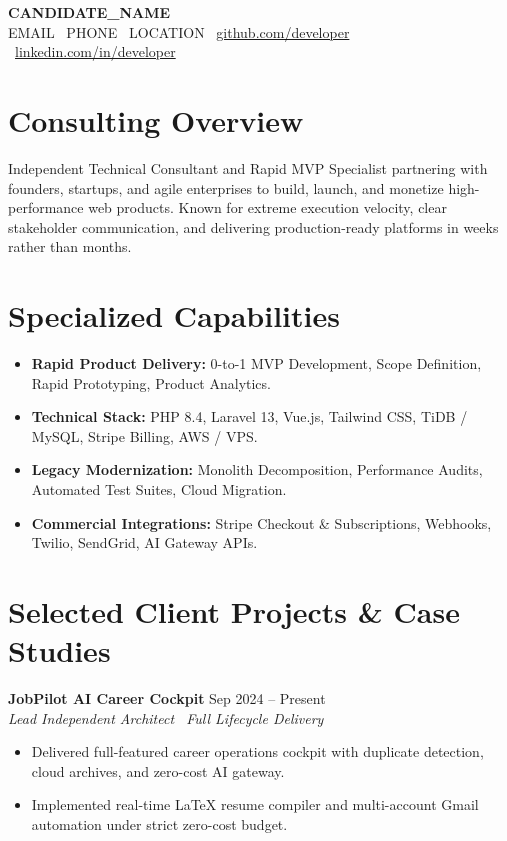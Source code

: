 \documentclass[10pt,a4paper]{article}
\begin{document}
\begin{center}
    {\huge \textbf{{{CANDIDATE_NAME}}}}\\[3pt]
    \small {{EMAIL}} \textbar\ {{PHONE}} \textbar\ {{LOCATION}} \textbar\ \href{https://github.com/candidate}{github.com/developer} \textbar\ \href{https://linkedin.com/in/candidate}{linkedin.com/in/developer}
\end{center}

\vspace{-4pt}
\section{Consulting Overview}
Independent Technical Consultant and Rapid MVP Specialist partnering with founders, startups, and agile enterprises to build, launch, and monetize high-performance web products. Known for extreme execution velocity, clear stakeholder communication, and delivering production-ready platforms in weeks rather than months.

\section{Specialized Capabilities}
\begin{itemize}
    \item \textbf{Rapid Product Delivery:} 0-to-1 MVP Development, Scope Definition, Rapid Prototyping, Product Analytics.
    \item \textbf{Technical Stack:} PHP 8.4, Laravel 13, Vue.js, Tailwind CSS, TiDB / MySQL, Stripe Billing, AWS / VPS.
    \item \textbf{Legacy Modernization:} Monolith Decomposition, Performance Audits, Automated Test Suites, Cloud Migration.
    \item \textbf{Commercial Integrations:} Stripe Checkout \& Subscriptions, Webhooks, Twilio, SendGrid, AI Gateway APIs.
\end{itemize}

\section{Selected Client Projects \& Case Studies}
\textbf{JobPilot AI Career Cockpit} \hfill Sep 2024 -- Present\\
\textit{Lead Independent Architect \textbar\ Full Lifecycle Delivery}
\begin{itemize}
    \item Delivered full-featured career operations cockpit with duplicate detection, cloud archives, and zero-cost AI gateway.
    \item Implemented real-time LaTeX resume compiler and multi-account Gmail automation under strict zero-cost budget.
\end{itemize}
\end{document}
